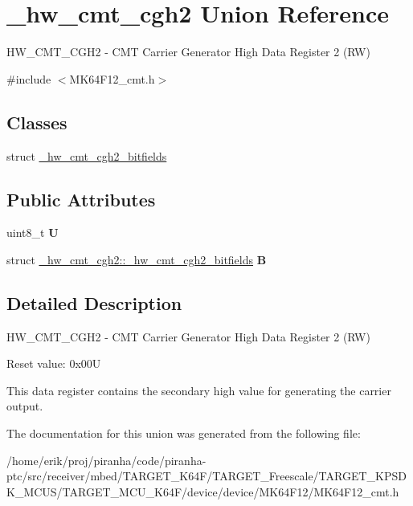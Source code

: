 \hypertarget{union__hw__cmt__cgh2}{}\section{\+\_\+hw\+\_\+cmt\+\_\+cgh2 Union Reference}
\label{union__hw__cmt__cgh2}


H\+W\+\_\+\+C\+M\+T\+\_\+\+C\+G\+H2 -\/ C\+MT Carrier Generator High Data Register 2 (RW)  




{\ttfamily \#include $<$M\+K64\+F12\+\_\+cmt.\+h$>$}

\subsection*{Classes}
\begin{DoxyCompactItemize}
\item 
struct \hyperlink{struct__hw__cmt__cgh2_1_1__hw__cmt__cgh2__bitfields}{\+\_\+hw\+\_\+cmt\+\_\+cgh2\+\_\+bitfields}
\end{DoxyCompactItemize}
\subsection*{Public Attributes}
\begin{DoxyCompactItemize}
\item 
uint8\+\_\+t {\bfseries U}\hypertarget{union__hw__cmt__cgh2_a429ee3127e3e2ba95449f8a5dd94d0ed}{}\label{union__hw__cmt__cgh2_a429ee3127e3e2ba95449f8a5dd94d0ed}

\item 
struct \hyperlink{struct__hw__cmt__cgh2_1_1__hw__cmt__cgh2__bitfields}{\+\_\+hw\+\_\+cmt\+\_\+cgh2\+::\+\_\+hw\+\_\+cmt\+\_\+cgh2\+\_\+bitfields} {\bfseries B}\hypertarget{union__hw__cmt__cgh2_ae4f3b0739b4fede7462e7a4c4aa6a782}{}\label{union__hw__cmt__cgh2_ae4f3b0739b4fede7462e7a4c4aa6a782}

\end{DoxyCompactItemize}


\subsection{Detailed Description}
H\+W\+\_\+\+C\+M\+T\+\_\+\+C\+G\+H2 -\/ C\+MT Carrier Generator High Data Register 2 (RW) 

Reset value\+: 0x00U

This data register contains the secondary high value for generating the carrier output. 

The documentation for this union was generated from the following file\+:\begin{DoxyCompactItemize}
\item 
/home/erik/proj/piranha/code/piranha-\/ptc/src/receiver/mbed/\+T\+A\+R\+G\+E\+T\+\_\+\+K64\+F/\+T\+A\+R\+G\+E\+T\+\_\+\+Freescale/\+T\+A\+R\+G\+E\+T\+\_\+\+K\+P\+S\+D\+K\+\_\+\+M\+C\+U\+S/\+T\+A\+R\+G\+E\+T\+\_\+\+M\+C\+U\+\_\+\+K64\+F/device/device/\+M\+K64\+F12/M\+K64\+F12\+\_\+cmt.\+h\end{DoxyCompactItemize}
